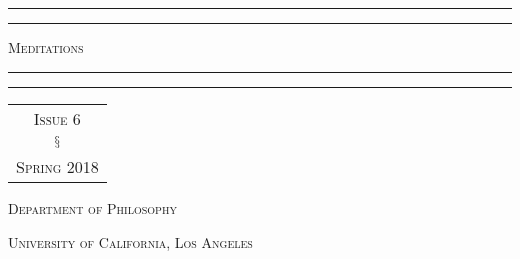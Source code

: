 \begin{titlepage} %

	\centering %
	
	\vspace*{\baselineskip} %
	
	
	\rule{\textwidth}{1.6pt}\vspace*{-\baselineskip}\vspace*{2pt} %
	\rule{\textwidth}{0.4pt} %
	
	\vspace{1\baselineskip} %
	
	{\HUGE \scshape{}\selectfont Meditations} %
	
	\vspace{0.5\baselineskip} %
	
	\rule{\textwidth}{0.4pt}\vspace*{-\baselineskip}\vspace{3.2pt} %
	\rule{\textwidth}{1.6pt} %
	
	\vspace{3\baselineskip} %
	
	
	{\LARGE 
		\selectfont 
		\begin{tabular}{c}
		\textsc{Issue 6}
		\vspace{0.75em}
		 \\
		$\mathsection$ 
		\vspace{0.75em}
		\\
	 	\textsc{Spring} 2018
	 	\end{tabular}
	 }
	
	
	\vspace*{3\baselineskip} %
	
	
	\vfill %
	
	
	{\scshape\LARGE Department of Philosophy}
	
	\vspace{0.5\baselineskip} 
	
	{\scshape\large University of California, Los Angeles}

\end{titlepage}

